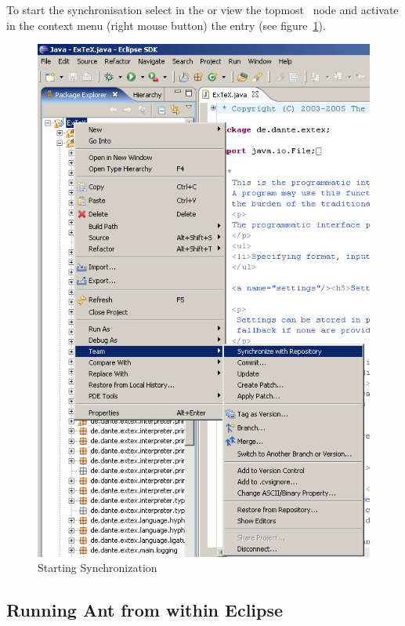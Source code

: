 To start the synchronisation select in the  or
 view the topmost \ExTeX\ node and activate in the
context menu (right mouse button) the entry  (see figure~\ref{fig:eclipse-team}).
\begin{figure}[htp]
  \centering
  \includegraphics[scale=.4]{image/eclipse-team}
  \caption{Starting Synchronization}\label{fig:eclipse-team}
\end{figure}



\INCOMPLETE



\subsection{Running Ant from within Eclipse}\label{sec:eclipse.ant}

